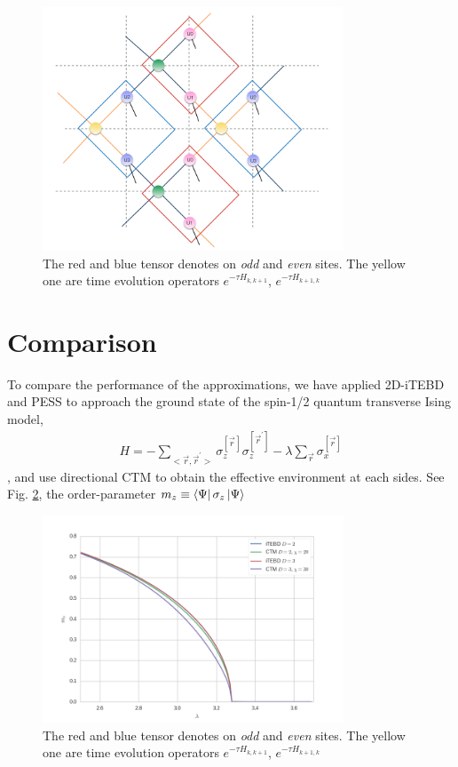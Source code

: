 \begin{figure}[ht]
	\centering
	\includegraphics[width=0.80\textwidth]{figures/fig521.png}
	\caption[The picture of the main idea of itebd.]{The red and blue tensor denotes on \textit{odd} and \textit{even} sites. The yellow one are time evolution operators $e^{-\tau H_{k,k+1}}$, $e^{-\tau H_{k+1,k}}$}
	\label{fig521}
\end{figure}

\section{Comparison}

To compare the performance of the approximations, we have applied 2D-iTEBD and PESS to approach the ground state of the spin-1/2 quantum transverse Ising model, 
\begin{align}
	H = -\sum_{<\vec{r},\vec{r}^{\prime}>}{\sigma_z^{\left[ \vec{r}^{} \right]} \sigma_z^{\left[ \vec{r}^{\prime} \right]}} - \lambda \sum_{\vec{r}}{\sigma_x^{\left[ \vec{r} \right]}}
\end{align}
, and use directional CTM to obtain the effective environment at each sides. See Fig. \ref{fig522}, the order-parameter $m_z \equiv  \Bra{\Psi} \sigma_z \Ket{\Psi}$ 

\begin{figure}[H]
	\centering
	\includegraphics[width=0.80\textwidth]{figures/ctm_itebd.png}
	\caption[The picture of the main idea of itebd.]{The red and blue tensor denotes on \textit{odd} and \textit{even} sites. The yellow one are time evolution operators $e^{-\tau H_{k,k+1}}$, $e^{-\tau H_{k+1,k}}$}
	\label{fig522}
\end{figure}

